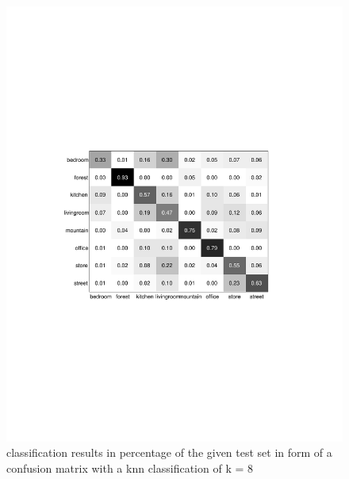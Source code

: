 \documentclass[subfigure,epsfig,fleqn,float,numbers=noenddot]{scrartcl}
\begin{document}
\begin{figure}
		\centering
		\includegraphics[width=\textwidth]{img/conf_matrix_k8.pdf}
		\caption{classification results in percentage of the given test set in form of a confusion matrix with a knn classification of k = 8}
		\label{fig:knn}
\end{figure}
\end{document}

